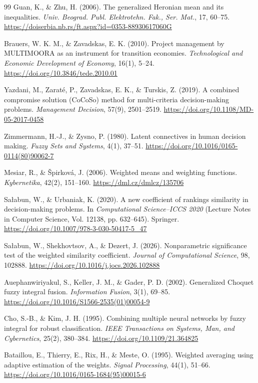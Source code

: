 \documentclass[reqno,11pt]{amsart}
\theoremstyle{definition}
\theoremstyle{plain}
\theoremstyle{remark}
\begin{document}
\begin{thebibliography}{99}
Guan, K., \& Zhu, H. (2006).
The generalized Heronian mean and its inequalities.
\emph{Univ. Beograd. Publ. Elektrotehn. Fak., Ser. Mat.},
17, 60--75.
\url{https://doiserbia.nb.rs/ft.aspx?id=0353-88930617060G}

Brauers, W. K. M., \& Zavadskas, E. K. (2010). Project management by MULTIMOORA as an instrument for transition economies. \emph{Technological and Economic Development of Economy}, 16(1), 5--24. \url{https://doi.org/10.3846/tede.2010.01}

Yazdani, M., Zarat\'e, P., Zavadskas, E. K., \& Turskis, Z. (2019). A combined compromise solution (CoCoSo) method for multi-criteria decision-making problems. \emph{Management Decision}, 57(9), 2501--2519. \url{https://doi.org/10.1108/MD-05-2017-0458}

Zimmermann, H.-J., \& Zysno, P. (1980). Latent connectives in human decision making. \emph{Fuzzy Sets and Systems}, 4(1), 37--51. \url{https://doi.org/10.1016/0165-0114(80)90062-7}

Mesiar, R., \& \v{S}pirkov\'a, J. (2006). Weighted means and weighting functions. \emph{Kybernetika}, 42(2), 151--160. \url{https://dml.cz/dmlcz/135706}

Sa\l{}abun, W., \& Urbaniak, K. (2020). A new coefficient of rankings similarity in decision-making problems. In \emph{Computational Science--ICCS 2020} (Lecture Notes in Computer Science, Vol. 12138, pp. 632--645). Springer. \url{https://doi.org/10.1007/978-3-030-50417-5_47}

Sa\l{}abun, W., Shekhovtsov, A., \& Dezert, J. (2026). Nonparametric significance test of the weighted similarity coefficient. \emph{Journal of Computational Science}, 98, 102888. \url{https://doi.org/10.1016/j.jocs.2026.102888}


Auephanwiriyakul, S., Keller, J. M., \& Gader, P. D. (2002).
Generalized Choquet fuzzy integral fusion.
\emph{Information Fusion}, 3(1), 69--85.
\url{https://doi.org/10.1016/S1566-2535(01)00054-9}

Cho, S.-B., \& Kim, J. H. (1995).
Combining multiple neural networks by fuzzy integral for robust
classification.
\emph{IEEE Transactions on Systems, Man, and Cybernetics}, 25(2),
380--384.
\url{https://doi.org/10.1109/21.364825}


Bataillou, E., Thierry, E., Rix, H., \& Meste, O. (1995).
Weighted averaging using adaptive estimation of the weights.
\emph{Signal Processing}, 44(1), 51--66.
\url{https://doi.org/10.1016/0165-1684(95)00015-6}


\end{thebibliography}
\end{document}

